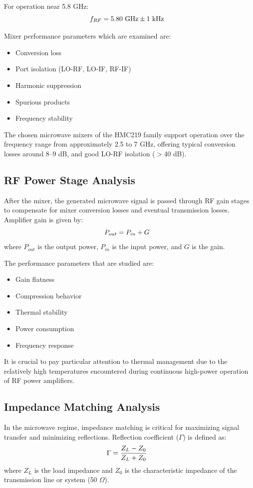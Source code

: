 \documentclass[12pt,a4paper]{report}
\begin{document}
	For operation near 5.8 GHz:
	\begingroup
	\setlength{\mathindent}{0pt}
	\begin{equation*}
		\hfill
		f_{RF} = 5.80\ \text{GHz} \pm 1\ \text{kHz}
		\hfill
	\end{equation*}
	\endgroup
	
	Mixer performance parameters which are examined are:
	\begin{itemize}
		\item Conversion loss
		\item Port isolation (LO-RF, LO-IF, RF-IF)
		\item Harmonic suppression
		\item Spurious products
		\item Frequency stability
	\end{itemize}
	
	The chosen microwave mixers of the HMC219 family support operation over the frequency range from approximately 2.5 to 7 GHz, offering typical conversion losses around 8--9 dB, and good LO-RF isolation ($>$40 dB).
	
	\subsection{RF Power Stage Analysis}
	After the mixer, the generated microwave signal is passed through RF gain stages to compensate for mixer conversion losses and eventual transmission losses. Amplifier gain is given by:
	\begingroup
	\setlength{\mathindent}{0pt}
	\begin{equation*}
		\hfill
		P_{out} = P_{in} + G
		\hfill
	\end{equation*}
	\endgroup
	where $P_{out}$ is the output power, $P_{in}$ is the input power, and $G$ is the gain.
	
	The performance parameters that are studied are:
	\begin{itemize}
		\item Gain flatness
		\item Compression behavior
		\item Thermal stability
		\item Power consumption
		\item Frequency response
	\end{itemize}
	
	It is crucial to pay particular attention to thermal management due to the relatively high temperatures encountered during continuous high-power operation of RF power amplifiers.
	\subsection{Impedance Matching Analysis}
	In the microwave regime, impedance matching is critical for maximizing signal transfer and minimizing reflections. Reflection coefficient ($\Gamma$) is defined as:
	\begingroup
	\setlength{\mathindent}{0pt}
	\begin{equation*}
		\hfill
		\Gamma = \frac{Z_L - Z_0}{Z_L + Z_0}
		\hfill
	\end{equation*}
	\endgroup
	where $Z_L$ is the load impedance and $Z_0$ is the characteristic impedance of the transmission line or system (50 $\Omega$).
	
\end{document}
